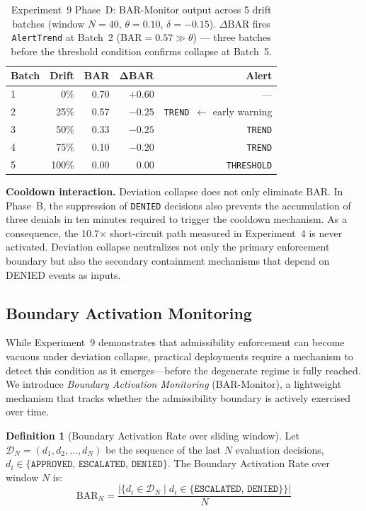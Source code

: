 \documentclass[11pt]{article}
\theoremstyle{definition}
\newtheorem{definition}{Definition}
\begin{document}
\begin{table}[h!]
\centering
\small
\begin{tabular}{@{}lrrrr@{}}
\toprule
\textbf{Batch} & \textbf{Drift} & \textbf{BAR} & $\boldsymbol{\Delta}\textbf{BAR}$ & \textbf{Alert} \\
\midrule
1 & \phantom{0}0\%  & 0.70 & $+0.60$ & --- \\
2 & 25\%             & 0.57 & $-0.25$ & \texttt{TREND}~$\leftarrow$ early warning \\
3 & 50\%             & 0.33 & $-0.25$ & \texttt{TREND} \\
4 & 75\%             & 0.10 & $-0.20$ & \texttt{TREND} \\
5 & 100\%            & 0.00 & $\phantom{+}0.00$ & \texttt{THRESHOLD} \\
\bottomrule
\end{tabular}
\caption{Experiment~9 Phase~D: BAR-Monitor output across 5 drift batches
  (window $N=40$, $\theta=0.10$, $\delta=-0.15$).
  $\Delta\mathrm{BAR}$ fires \texttt{AlertTrend} at Batch~2
  ($\mathrm{BAR}=0.57 \gg \theta$) --- three batches before the
  threshold condition confirms collapse at Batch~5.}
\label{tab:exp9-phased}
\end{table}

\textbf{Cooldown interaction.}
Deviation collapse does not only eliminate BAR.
In Phase~B, the suppression of \texttt{DENIED} decisions also prevents the
accumulation of three denials in ten minutes required to trigger the cooldown
mechanism.
As a consequence, the 10.7$\times$ short-circuit path measured in
Experiment~4 is never activated.
Deviation collapse neutralizes not only the primary enforcement boundary
but also the secondary containment mechanisms that depend on DENIED events
as inputs.

\subsection{Boundary Activation Monitoring}
\label{sec:bar}
\label{sec:bar-monitor}

While Experiment~9 demonstrates that admissibility enforcement can become
vacuous under deviation collapse, practical deployments require a mechanism
to detect this condition as it emerges---before the degenerate regime is
fully reached.
We introduce \emph{Boundary Activation Monitoring} (BAR-Monitor), a
lightweight mechanism that tracks whether the admissibility boundary is
actively exercised over time.

\begin{definition}[Boundary Activation Rate over sliding window]
Let $\mathcal{D}_N = (d_1, d_2, \ldots, d_N)$ be the sequence of the last
$N$ evaluation decisions, $d_i \in \{\texttt{APPROVED},\,\texttt{ESCALATED},\,\texttt{DENIED}\}$.
The Boundary Activation Rate over window $N$ is:
\[
  \mathrm{BAR}_N
    = \frac{|\{d_i \in \mathcal{D}_N \mid d_i \in \{\texttt{ESCALATED},\,\texttt{DENIED}\}\}|}{N}
\]
\end{definition}
\end{document}
